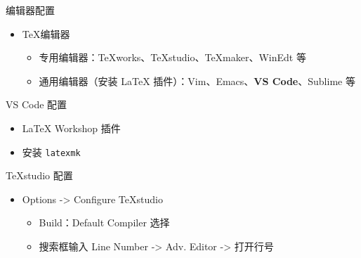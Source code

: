 \begin{frame}{编辑器配置}
  \begin{itemize}
    \item \TeX{}编辑器
      \begin{itemize}
        \item 专用编辑器：TeXworks、TeXstudio、TeXmaker、WinEdt 等
        \item 通用编辑器（安装 \LaTeX{} 插件）：Vim、Emacs、\textbf{VS Code}、Sublime 等
      \end{itemize}
  \end{itemize}
  \begin{exampleblock}{VS Code 配置}
    \begin{itemize}
      \item LaTeX Workshop 插件
      \item 安装 \texttt{latexmk}
    \end{itemize}
  \end{exampleblock}
  \begin{exampleblock}{TeXstudio 配置}
    \begin{itemize}
      \item Options -> Configure TeXstudio
        \begin{itemize}
          \item Build：Default Compiler 选择 \XeLaTeX{}
          \item 搜索框输入 Line Number -> Adv. Editor -> 打开行号
        \end{itemize}
    \end{itemize}
  \end{exampleblock}
\end{frame}

